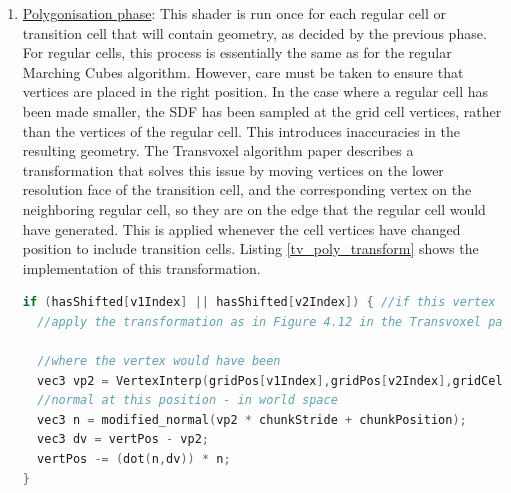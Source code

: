 \documentclass{article}
\begin{document}
\begin{enumerate}
\begin{lstlisting}
//do not march if all inside or all outside
if (transitionCellIndex != 0 && transitionCellIndex != 511) {
  //number of points in the mesh
  //and with 0x7f for lookup table
  atomicCounterAddARB(pointCount,transitionTotalTable[0x7F & transitionCellClass[transitionCellIndex]]);

  uint bufferIndex = atomicCounterIncrement(marchableCount);
  uvec4 mc = uvec4(gid.x,gid.y,gid.z,paddedTransitionCellIndex);
  marchableList[bufferIndex] = mc;
}
\end{lstlisting}

\item \underline{Polygonisation phase}: This shader is run once for each regular cell or transition cell that will contain geometry, as decided by the previous phase. For regular cells, this process is essentially the same as for the regular Marching Cubes algorithm. However, care must be taken to ensure that vertices are placed in the right position. In the case where a regular cell has been made smaller, the SDF has been sampled at the grid cell vertices, rather than the vertices of the regular cell. This introduces inaccuracies in the resulting geometry. The Transvoxel algorithm paper describes a transformation that solves this issue by moving vertices on the lower resolution face of the transition cell, and the corresponding vertex on the neighboring regular cell, so they are on the edge that the regular cell would have generated. This is applied whenever the cell vertices have changed position to include transition cells. Listing \ref{tv_poly_transform} shows the implementation of this transformation.

\begin{lstlisting}[language=C++,label={tv_poly_transform},caption={Transformation to be applied to a generated vertex, when the cell vertices it is being generated between have moved.}]
if (hasShifted[v1Index] || hasShifted[v2Index]) { //if this vertex has moved - either as a transition cell, or to accommodate for one
  //apply the transformation as in Figure 4.12 in the Transvoxel paper

  //where the vertex would have been
  vec3 vp2 = VertexInterp(gridPos[v1Index],gridPos[v2Index],gridCells[v1Index], gridCells[v2Index]);
  //normal at this position - in world space
  vec3 n = modified_normal(vp2 * chunkStride + chunkPosition);
  vec3 dv = vertPos - vp2;
  vertPos -= (dot(n,dv)) * n;
}
\end{lstlisting}


\end{enumerate}
\end{document}
